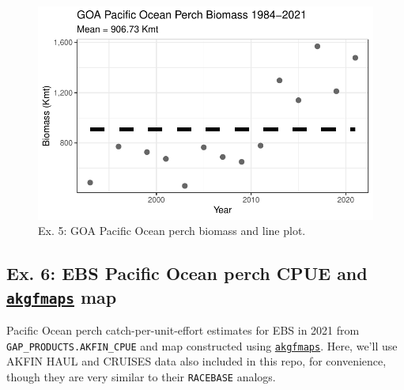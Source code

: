\documentclass[
  letterpaper,
  oneside,
  open=any]{scrbook}
\begin{document}
\begin{figure}[H]

{\centering \includegraphics{content/akfin-oracle-sql-r_files/figure-pdf/test-5-fig-1.pdf}

}

\caption{Ex. 5: GOA Pacific Ocean perch biomass and line plot.}

\end{figure}

\hypertarget{ex.-6-ebs-pacific-ocean-perch-cpue-and-akgfmaps-map}{%
\subsection{\texorpdfstring{Ex. 6: EBS Pacific Ocean perch CPUE and
\href{https://github.com/afsc-gap-products/akgfmaps}{\texttt{akgfmaps}}
map}{Ex. 6: EBS Pacific Ocean perch CPUE and akgfmaps map}}\label{ex.-6-ebs-pacific-ocean-perch-cpue-and-akgfmaps-map}}

Pacific Ocean perch catch-per-unit-effort estimates for EBS in 2021 from
\texttt{GAP\_PRODUCTS.AKFIN\_CPUE} and map constructed using
\href{https://github.com/afsc-gap-products/akgfmaps}{\texttt{akgfmaps}}.
Here, we'll use AKFIN HAUL and CRUISES data also included in this repo,
for convenience, though they are very similar to their \texttt{RACEBASE}
analogs.
\end{document}

